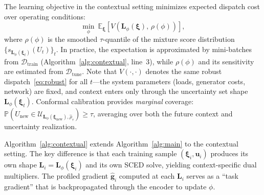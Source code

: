 \documentclass[11pt]{article}
\newcommand{\E}{\mathbb{E}}
\newcommand{\Prob}{\mathbb{P}}
\newcommand{\cU}{\mathcal{U}}
\newcommand{\cD}{\mathcal{D}}
\newcommand{\bu}{\bm{u}}
\newcommand{\bxi}{\bm{\xi}}
\newcommand{\bL}{\bm{L}}
\newcommand{\bg}{\bm{g}}
\theoremstyle{definition}
\begin{document}
The learning objective in the contextual setting minimizes expected dispatch cost over operating conditions:
\begin{equation}\label{eq:contextual-objective}
\min_{\phi}\ \E_{\bxi}\left[V(\bL_\phi(\bxi),\, \rho(\phi))\right],
\end{equation}
where $\rho(\phi)$ is the smoothed $\tau$-quantile of the mixture score distribution $\{s_{\bL_\phi(\bxi_t)}(U_t)\}_{t}$. In practice, the expectation is approximated by mini-batches from $\cD_{\text{train}}$ (Algorithm~\ref{alg:contextual}, line~3), while $\rho(\phi)$ and its sensitivity are estimated from $\cD_{\text{tune}}$. Note that $V(\cdot,\cdot)$ denotes the same robust dispatch~\eqref{eq:robust} for all $t$---the system parameters (loads, generator costs, network) are fixed, and context enters only through the uncertainty set shape $\bL_\phi(\bxi_t)$. Conformal calibration provides \emph{marginal} coverage: $\Prob(U_{\mathrm{new}} \in \cU_{\bL_\phi(\bxi_{\mathrm{new}}), \hat{\rho}_\tau}) \geq \tau$, averaging over both the future context and uncertainty realization.

Algorithm~\ref{alg:contextual} extends Algorithm~\ref{alg:main} to the contextual setting. The key difference is that each training sample $(\bxi_i, \bu_i)$ produces its own shape $\bL_i = \bL_\phi(\bxi_i)$ and its own SCED solve, yielding context-specific dual multipliers. The profiled gradient $\hat{\bg}_i$ computed at each $\bL_i$ serves as a ``task gradient'' that is backpropagated through the encoder to update $\phi$.
\end{document}
